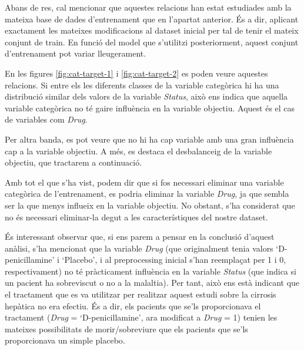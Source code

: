 Abans de res, cal mencionar que aquestes relacions han estat estudiades amb la mateixa base de dades d'entrenament que en l'apartat anterior. És a dir, aplicant exactament les mateixes modificacions al dataset inicial per tal de tenir el mateix conjunt de train. En funció del model que s'utilitzi posteriorment, aquest conjunt d'entrenament pot variar lleugerament.

En les figures \ref{fig:cat-target-1} i \ref{fig:cat-target-2} es poden veure aquestes relacions. Si entre els les diferents classes de la variable categòrica hi ha una distribució similar dels valors de la variable \textit{Status}, això ens indica que aquella variable categòrica no té gaire influència en la variable objectiu. Aquest és el cas de variables com \textit{Drug}.

Per altra banda, es pot veure que no hi ha cap variable amb una gran influència cap a la variable objectiu. A més, es destaca el desbalanceig de la variable objectiu, que tractarem a continuació. 

Amb tot el que s'ha vist, podem dir que si fos necessari eliminar una variable categòrica de l'entrenament, es podria eliminar la variable \textit{Drug}, ja que sembla ser la que menys influeix en la variable objectiu. No obstant, s'ha considerat que no és necessari eliminar-la degut a les característiques del nostre dataset.

És interessant observar que, si ens parem a pensar en la conclusió d'aquest anàlisi, s'ha mencionat que la variable \textit{Drug} (que originalment tenia valors `D-penicillamine' i `Placebo', i al preprocessing inicial s'han reemplaçat per 1 i 0, respectivament) no té pràcticament influència en la variable \textit{Status} (que indica si un pacient ha sobreviscut o no a la malaltia). Per tant, això ens està indicant que el tractament que es va utilitzar per realitzar aquest estudi sobre la cirrosis hepàtica no era efectiu. És a dir, els pacients que se'ls proporcionava el tractament (\textit{Drug} = `D-penicillamine', ara modificat a \textit{Drug} = 1) tenien les mateixes possibilitats de morir/sobreviure que els pacients que se'ls proporcionava un simple placebo.

